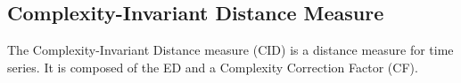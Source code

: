 \subsection{Complexity-Invariant Distance Measure} \label{complexity-invariant_distance_measure}
The Complexity-Invariant Distance measure \cite{batista2011complexity} (CID) is a distance measure for time
series. It is composed of the ED and a Complexity Correction Factor (CF).

